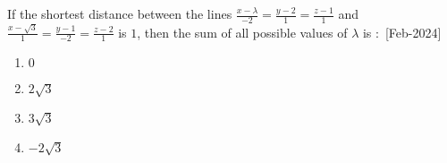     \item If the shortest distance between the lines $\frac{x-\lambda}{-2}=\frac{y-2}{1}=\frac{z-1}{1}$ and $\frac{x-\sqrt{3}}{1}=\frac{y-1}{-2}=\frac{z-2}{1}$ is $1$, then the sum of all possible values of $\lambda$ is $\colon$ 
    \hfill{[Feb-2024]}
        \begin{enumerate}
            \item $0$
            \item $2\sqrt{3}$
            \item $3\sqrt{3}$
            \item $-2\sqrt{3}$
        \end{enumerate}
